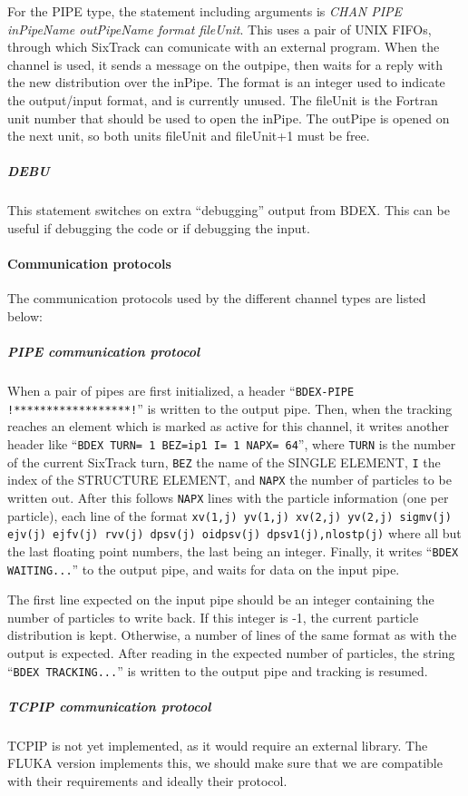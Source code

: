 \documentclass[a4paper,11pt]{report}
\begin{document}
For the PIPE type, the statement including arguments is \emph{CHAN PIPE inPipeName outPipeName format fileUnit}.
This uses a pair of UNIX FIFOs, through which SixTrack can comunicate with an external program.
When the channel is used, it sends a message on the outpipe, then waits for a reply with the new distribution over the inPipe.
The format is an integer used to indicate the output/input format, and is currently unused.
The fileUnit is the Fortran unit number that should be used to open the inPipe.
The outPipe is opened on the next unit, so both units fileUnit and fileUnit+1 must be free.

\subparagraph{DEBU}
This statement switches on extra ``debugging'' output from BDEX.
This can be useful if debugging the code or if debugging the input.

\paragraph{Communication protocols}
The communication protocols used by the different channel types are listed below:
\subparagraph{PIPE communication protocol}
When a pair of pipes are first initialized, a header ``\texttt{BDEX-PIPE !******************!}'' is written to the output pipe.
Then, when the tracking reaches an element which is marked as active for this channel, it writes another header like ``\texttt{BDEX TURN= 1 BEZ=ip1 I= 1 NAPX= 64}'', where \texttt{TURN} is the number of the current SixTrack turn, \texttt{BEZ} the name of the SINGLE ELEMENT, \texttt{I} the index of the STRUCTURE ELEMENT, and \texttt{NAPX} the number of particles to be written out.
After this follows \texttt{NAPX} lines with the particle information (one per particle), each line of the format \texttt{xv(1,j) yv(1,j) xv(2,j) yv(2,j) sigmv(j) ejv(j) ejfv(j) rvv(j) dpsv(j) oidpsv(j) dpsv1(j),nlostp(j)} where all but the last floating point numbers, the last being an integer.
Finally, it writes ``\texttt{BDEX WAITING...}'' to the output pipe, and waits for data on the input pipe.

The first line expected on the input pipe should be an integer containing the number of particles to write back.
If this integer is -1, the current particle distribution is kept.
Otherwise, a number of lines of the same format as with the output is expected.
After reading in the expected number of particles, the string ``\texttt{BDEX TRACKING...}'' is written to the output pipe and tracking is resumed.

\subparagraph{TCPIP communication protocol}
TCPIP is not yet implemented, as it would require an external library.
The FLUKA version implements this, we should make sure that we are compatible with their requirements and ideally their protocol.
\end{document}

